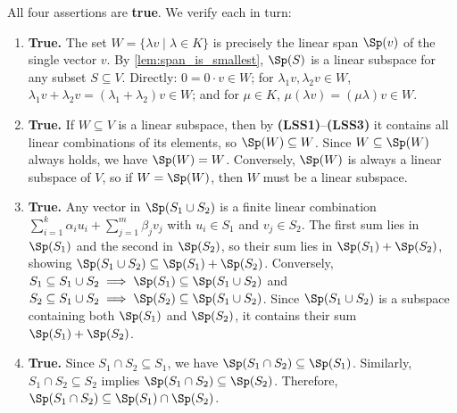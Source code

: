 \begin{exercisesolution*}
\label{sol:span_subspaces_mc}
All four assertions are \textbf{true}. We verify each in turn:

\begin{enumerate}[label=\textbf{(\arabic*)}]
    \item \textbf{True.} The set $W = \{\lambda v \mid \lambda \in K\}$ is precisely the linear span $\Sp(v)$ of the single vector $v$. By \cref{lem:span_is_smallest}, $\Sp(S)$ is a linear subspace for any subset $S \subseteq V$. Directly: $0 = 0 \cdot v \in W$; for $\lambda_1 v, \lambda_2 v \in W$, $\lambda_1 v + \lambda_2 v = (\lambda_1 + \lambda_2) v \in W$; and for $\mu \in K$, $\mu (\lambda v) = (\mu \lambda) v \in W$.

    \item \textbf{True.} If $W \subseteq V$ is a linear subspace, then by \textbf{(LSS1)}--\textbf{(LSS3)} it contains all linear combinations of its elements, so $\Sp(W) \subseteq W$. Since $W \subseteq \Sp(W)$ always holds, we have $\Sp(W) = W$. Conversely, $\Sp(W)$ is always a linear subspace of $V$, so if $W = \Sp(W)$, then $W$ must be a linear subspace.

    \item \textbf{True.} Any vector in $\Sp(S_1 \cup S_2)$ is a finite linear combination $\sum_{i=1}^k \alpha_i u_i + \sum_{j=1}^m \beta_j v_j$ with $u_i \in S_1$ and $v_j \in S_2$. The first sum lies in $\Sp(S_1)$ and the second in $\Sp(S_2)$, so their sum lies in $\Sp(S_1) + \Sp(S_2)$, showing $\Sp(S_1 \cup S_2) \subseteq \Sp(S_1) + \Sp(S_2)$. Conversely, $S_1 \subseteq S_1 \cup S_2 \implies \Sp(S_1) \subseteq \Sp(S_1 \cup S_2)$ and $S_2 \subseteq S_1 \cup S_2 \implies \Sp(S_2) \subseteq \Sp(S_1 \cup S_2)$. Since $\Sp(S_1 \cup S_2)$ is a subspace containing both $\Sp(S_1)$ and $\Sp(S_2)$, it contains their sum $\Sp(S_1) + \Sp(S_2)$.

    \item \textbf{True.} Since $S_1 \cap S_2 \subseteq S_1$, we have $\Sp(S_1 \cap S_2) \subseteq \Sp(S_1)$. Similarly, $S_1 \cap S_2 \subseteq S_2$ implies $\Sp(S_1 \cap S_2) \subseteq \Sp(S_2)$. Therefore, $\Sp(S_1 \cap S_2) \subseteq \Sp(S_1) \cap \Sp(S_2)$.
\end{enumerate}
\end{exercisesolution*}

